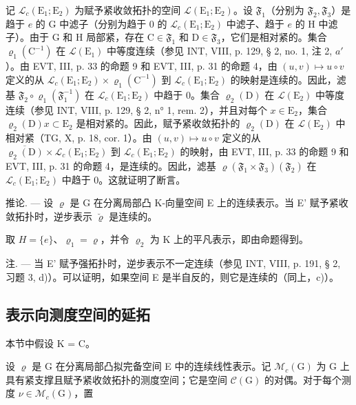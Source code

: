 记 \(\mathcal{L}_c(\mathrm{E}_1;\mathrm{E}_2)\) 为赋予紧收敛拓扑的空间 \(\mathcal{L}(\mathrm{E}_1;\mathrm{E}_2)\)。设 \(\mathfrak{F}_1\)（分别为 \(\mathfrak{F}_2,\mathfrak{F}_3\)）是趋于 \(e\) 的 G 中滤子（分别为趋于 0 的 \(\mathcal{L}_c(\mathrm{E}_1;\mathrm{E}_2)\) 中滤子、趋于 \(e\) 的 H 中滤子）。由于 G 和 H 局部紧，存在 \(\mathrm{C}\in \mathfrak{F}_1\) 和 \(\mathrm{D}\in \mathfrak{F}_3\)，它们是相对紧的。集合 \(\varrho_1(\mathrm{C}^{-1})\) 在 \(\mathcal{L}(\mathrm{E}_1)\) 中等度连续（参见 INT, VIII, p. 129, § 2, no. 1, 注 2, \(a'\)）。由 EVT, III, p. 33 的命题 9 和 EVT, III, p. 31 的命题 4，由 \((u,v)\mapsto u\circ v\) 定义的从 \(\mathcal{L}_c(\mathrm{E}_1;\mathrm{E}_2)\times \varrho_1(\mathrm{C}^{-1})\) 到 \(\mathcal{L}_c(\mathrm{E}_1;\mathrm{E}_2)\) 的映射是连续的。因此，滤基 \(\mathfrak{F}_2\circ \varrho_1(\mathfrak{F}_1^{-1})\) 在 \(\mathcal{L}_c(\mathrm{E}_1;\mathrm{E}_2)\) 中趋于 0。集合 \(\varrho_2(\mathrm{D})\) 在 \(\mathcal{L}(\mathrm{E}_2)\) 中等度连续（参见 INT, VIII, p. 129, § 2, n° 1, rem. 2），并且对每个 \(x\in \mathrm{E}_2\)，集合 \(\varrho_2(\mathrm{D})x\subset \mathrm{E}_2\) 是相对紧的。因此，赋予紧收敛拓扑的 \(\varrho_2(\mathrm{D})\) 在 \(\mathcal{L}(\mathrm{E}_2)\) 中相对紧（TG, X, p. 18, cor. 1）。由 \((u,v)\mapsto u\circ v\) 定义的从 \(\overline{\varrho_2(\mathrm{D})}\times \mathcal{L}_c(\mathrm{E}_1;\mathrm{E}_2)\) 到 \(\mathcal{L}_c(\mathrm{E}_1;\mathrm{E}_2)\) 的映射，由 EVT, III, p. 33 的命题 9 和 EVT, III, p. 31 的命题 4，是连续的。因此，滤基 \(\varrho (\mathfrak{F}_1\times \mathfrak{F}_3)(\mathfrak{F}_2)\) 在 \(\mathcal{L}_c(\mathrm{E}_1;\mathrm{E}_2)\) 中趋于 0。这就证明了断言。

推论. --- 设 \(\varrho\) 是 G 在分离局部凸 K-向量空间 E 上的连续表示。当 E' 赋予紧收敛拓扑时，逆步表示 \(\breve{\varrho}\) 是连续的。

取 \(H = \{e\}\)、\(\varrho_{1} = \varrho\)，并令 \(\varrho_{2}\) 为 K 上的平凡表示，即由命题得到。

注. --- 当 E' 赋予强拓扑时，逆步表示不一定连续（参见 INT, VIII, p. 191, § 2, 习题 3, d)）。可以证明，如果空间 E 是半自反的，则它是连续的（同上，c)）。

\subsection{表示向测度空间的延拓}

本节中假设 K = C。

设 \(\varrho\) 是 G 在分离局部凸拟完备空间 E 中的连续线性表示。记 \(\mathcal{M}_{c}(\mathrm{G})\) 为 G 上具有紧支撑且赋予紧收敛拓扑的测度空间；它是空间 \(\mathcal{C}(\mathrm{G})\) 的对偶。对于每个测度 \(\nu \in \mathcal{M}_{c}(\mathrm{G})\)，置

